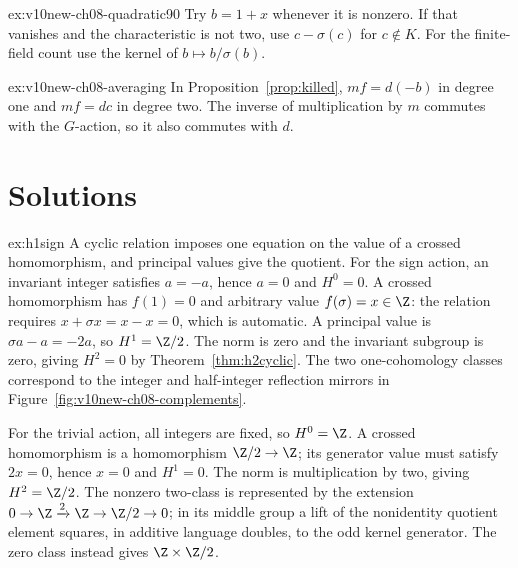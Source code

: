 \begin{hint}{ex:v10new-ch08-quadratic90}
Try $b=1+x$ whenever it is nonzero. If that vanishes and the characteristic is not two, use $c-\sigma(c)$ for $c\notin K$. For the finite-field count use the kernel of $b\mapsto b/\sigma(b)$.
\end{hint}

\begin{hint}{ex:v10new-ch08-averaging}
In Proposition~\ref{prop:killed}, $mf=d(-b)$ in degree one and $mf=dc$ in degree two. The inverse of multiplication by $m$ commutes with the $G$-action, so it also commutes with $d$.
\end{hint}

\section{Solutions}

\begin{solution}{ex:h1sign}
\idea A cyclic relation imposes one equation on the value of a crossed homomorphism, and principal values give the quotient.
\writeup For the sign action, an invariant integer satisfies $a=-a$, hence $a=0$ and $H^0=0$. A crossed homomorphism has $f(1)=0$ and arbitrary value $f(\sigma)=x\in\Z$: the relation requires $x+\sigma x=x-x=0$, which is automatic. A principal value is $\sigma a-a=-2a$, so $H^1=\Z/2$. The norm is zero and the invariant subgroup is zero, giving $H^2=0$ by Theorem~\ref{thm:h2cyclic}. The two one-cohomology classes correspond to the integer and half-integer reflection mirrors in Figure~\ref{fig:v10new-ch08-complements}.

For the trivial action, all integers are fixed, so $H^0=\Z$. A crossed homomorphism is a homomorphism $\Z/2\to\Z$; its generator value must satisfy $2x=0$, hence $x=0$ and $H^1=0$. The norm is multiplication by two, giving $H^2=\Z/2$. The nonzero two-class is represented by the extension
$0\to\Z\xrightarrow{2}\Z\to\Z/2\to0$; in its middle group a lift of the nonidentity quotient element squares, in additive language doubles, to the odd kernel generator. The zero class instead gives $\Z\times\Z/2$.
\end{solution}

